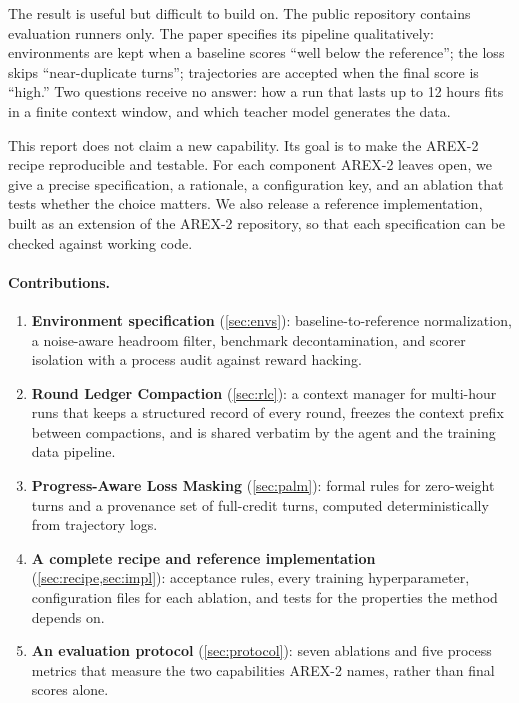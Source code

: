 \documentclass[11pt]{article}
\begin{document}
The result is useful but difficult to build on. The public repository contains evaluation runners only. The paper specifies its pipeline qualitatively: environments are kept when a baseline scores ``well below the reference''; the loss skips ``near-duplicate turns''; trajectories are accepted when the final score is ``high.'' Two questions receive no answer: how a run that lasts up to 12 hours fits in a finite context window, and which teacher model generates the data.

This report does not claim a new capability. Its goal is to make the AREX-2 recipe reproducible and testable. For each component AREX-2 leaves open, we give a precise specification, a rationale, a configuration key, and an ablation that tests whether the choice matters. We also release a reference implementation, built as an extension of the AREX-2 repository, so that each specification can be checked against working code.

\paragraph{Contributions.}
\begin{enumerate}
  \item \textbf{Environment specification} (\cref{sec:envs}): baseline-to-reference normalization, a noise-aware headroom filter, benchmark decontamination, and scorer isolation with a process audit against reward hacking.
  \item \textbf{Round Ledger Compaction} (\cref{sec:rlc}): a context manager for multi-hour runs that keeps a structured record of every round, freezes the context prefix between compactions, and is shared verbatim by the agent and the training data pipeline.
  \item \textbf{Progress-Aware Loss Masking} (\cref{sec:palm}): formal rules for zero-weight turns and a provenance set of full-credit turns, computed deterministically from trajectory logs.
  \item \textbf{A complete recipe and reference implementation} (\cref{sec:recipe,sec:impl}): acceptance rules, every training hyperparameter, configuration files for each ablation, and tests for the properties the method depends on.
  \item \textbf{An evaluation protocol} (\cref{sec:protocol}): seven ablations and five process metrics that measure the two capabilities AREX-2 names, rather than final scores alone.
\end{enumerate}
\end{document}
